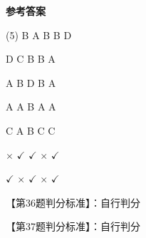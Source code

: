 \documentclass[11pt, a4paper]{article}
\begin{document}
\begin{center}
    \Huge \textbf{参考答案}
\end{center}

    \begin{tasks}[label=\arabic*. , label-width=14pt](5)
        \task B
        \task A
        \task B
        \task B
        \task D

        \task D
        \task C
        \task B
        \task B
        \task A

        \task A
        \task B
        \task D
        \task B
        \task A

        \task A
        \task A
        \task B
        \task A
        \task A

        \task C
        \task A
        \task B
        \task C
        \task C

        \task $\times$
        \task $\checkmark$
        \task $\checkmark$
        \task $\times$
        \task $\checkmark$

        \task $\checkmark$
        \task $\times$
        \task $\checkmark$
        \task $\times$
        \task $\checkmark$
    \end{tasks}

    【第36题判分标准】：自行判分

    【第37题判分标准】：自行判分
\end{document}
